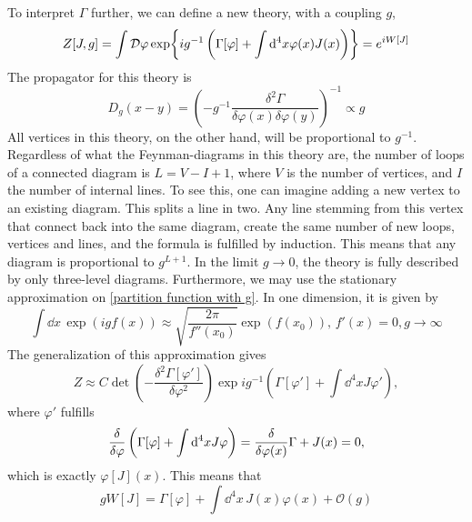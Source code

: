 To interpret $\Gamma$ further, we can define a new theory, with a coupling $g$, 
\begin{equation}
    \label{partition function with g}
    Z[J, g] = \int \mathcal{D} \varphi 
    \exp{ i g^{-1} \left( \Gamma[\varphi] + \int \dd^4x \varphi(x) J(x) \right) }
    = e^{iW[J]}
\end{equation}
The propagator for this theory is 
\begin{equation}
    D_g(x - y) 
    =
    \left(
         - g^{-1} \frac{\delta^2 \Gamma}{\delta \varphi(x) \delta \varphi(y)} 
         \right)^{-1} \propto g
\end{equation}
All vertices in this theory, on the other hand, will be proportional to $g^{-1}$.
Regardless of what the Feynman-diagrams in this theory are, the number of loops of a connected diagram is $L = V - I + 1$, where $V$ is the number of vertices, and $I$ the number of internal lines.
To see this, one can imagine adding a new vertex to an existing diagram.
This splits a line in two.
Any line stemming from this vertex that connect back into the same diagram, create the same number of new loops, vertices and lines, and the formula is fulfilled by induction.
This means that any diagram is proportional to $g^{L+1}$.
In the limit $g \rightarrow 0$, the theory is fully described by only three-level diagrams.
Furthermore, we may use the stationary approximation on \autoref{partition function with g}.
In one dimension, it is given by
\begin{equation}
    \int \dd x \, \exp(i g f(x)) 
    \approx \sqrt{\frac{2 \pi }{f''(x_0)}}\exp( f(x_0)), 
    \, f'(x) = 0, g\rightarrow \infty
\end{equation}
The generalization of this approximation gives
\begin{equation}
    Z \approx 
    C \det(- \frac{\delta^2 \Gamma[\varphi']}{\delta \varphi^2})
    \exp{i g^{-1} \left(\Gamma[\varphi'] + \int \dd^4x J \varphi'  \right)  },
\end{equation}
where $\varphi'$ fulfills
\begin{equation}
    \frac{\delta }{\delta \varphi} \left( \Gamma[\varphi] + \int \dd^4 x J \varphi \right)
    = \frac{\delta }{\delta \varphi(x)}{\Gamma} + J(x) = 0,
\end{equation}
which is exactly $\varphi[J](x)$. This means that
\begin{equation}
    g W[J] = \Gamma[\varphi] + \int \dd^4x\,  J(x) \varphi(x) + \mathcal{O}(g)
\end{equation}


